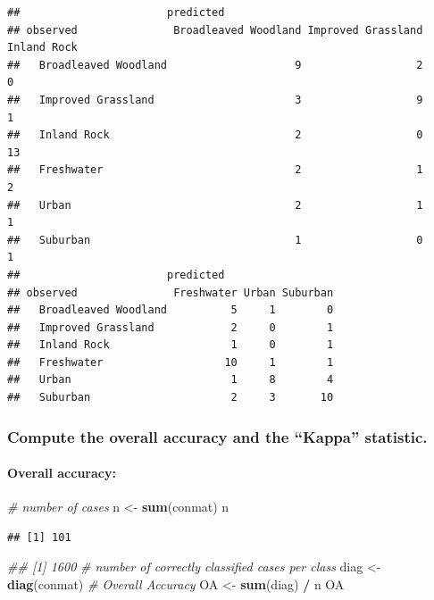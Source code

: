 \documentclass[]{article}
\newenvironment{Shaded}{\begin{snugshade}}{\end{snugshade}}
\newcommand{\CommentTok}[1]{\textcolor[rgb]{0.56,0.35,0.01}{\textit{#1}}}
\newcommand{\KeywordTok}[1]{\textcolor[rgb]{0.13,0.29,0.53}{\textbf{#1}}}
\newcommand{\NormalTok}[1]{#1}
\newcommand{\OperatorTok}[1]{\textcolor[rgb]{0.81,0.36,0.00}{\textbf{#1}}}
\newcommand{\StringTok}[1]{\textcolor[rgb]{0.31,0.60,0.02}{#1}}
\let\oldparagraph\paragraph
\renewcommand{\paragraph}[1]{\oldparagraph{#1}\mbox{}}
\begin{document}
\begin{verbatim}
##                       predicted
## observed               Broadleaved Woodland Improved Grassland Inland Rock
##   Broadleaved Woodland                    9                  2           0
##   Improved Grassland                      3                  9           1
##   Inland Rock                             2                  0          13
##   Freshwater                              2                  1           2
##   Urban                                   2                  1           1
##   Suburban                                1                  0           1
##                       predicted
## observed               Freshwater Urban Suburban
##   Broadleaved Woodland          5     1        0
##   Improved Grassland            2     0        1
##   Inland Rock                   1     0        1
##   Freshwater                   10     1        1
##   Urban                         1     8        4
##   Suburban                      2     3       10
\end{verbatim}

\hypertarget{compute-the-overall-accuracy-and-the-kappa-statistic.}{%
\subsubsection{Compute the overall accuracy and the ``Kappa''
statistic.}\label{compute-the-overall-accuracy-and-the-kappa-statistic.}}

\hypertarget{overall-accuracy}{%
\paragraph{Overall accuracy:}\label{overall-accuracy}}

\begin{Shaded}
\begin{Highlighting}[]
\CommentTok{# number of cases}
\NormalTok{n <-}\StringTok{ }\KeywordTok{sum}\NormalTok{(conmat)}
\NormalTok{n}
\end{Highlighting}
\end{Shaded}

\begin{verbatim}
## [1] 101
\end{verbatim}

\begin{Shaded}
\begin{Highlighting}[]
\CommentTok{## [1] 1600}
\CommentTok{# number of correctly classified cases per class}
\NormalTok{diag <-}\StringTok{ }\KeywordTok{diag}\NormalTok{(conmat)}
\CommentTok{# Overall Accuracy}
\NormalTok{OA <-}\StringTok{ }\KeywordTok{sum}\NormalTok{(diag) }\OperatorTok{/}\StringTok{ }\NormalTok{n}
\NormalTok{OA}
\end{Highlighting}
\end{Shaded}
\end{document}
